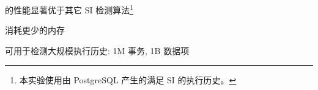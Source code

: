 % 		


\begin{frame}{}
	\centerline{\polysi{} 的性能显著优于其它 SI 检测算法\footnote{
		本实验使用由 PostgreSQL 产生的满足 SI 的执行历史。
	}}

\end{frame}

\begin{frame}{}
	\centerline{\polysi{} 消耗更少的内存}
\end{frame}

\begin{frame}{}
	\begin{center}
		\polysi{} 可用于检测大规模执行历史: 1M 事务, 1B 数据项

		\vspace{0.30cm}
		\vspace{0.30cm}
	\end{center}
\end{frame}

